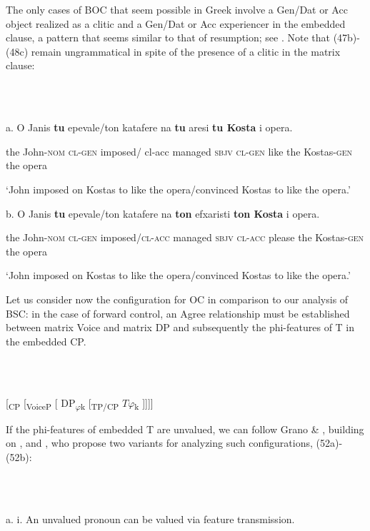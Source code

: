 \documentclass[output=paper]{langsci/langscibook}
\begin{document}
\begin{styleNurTexti}
  The only cases of BOC that seem possible in Greek involve a Gen/Dat or Acc object realized as a clitic and a Gen/Dat or Acc experiencer in the embedded clause, a pattern that seems similar to that of resumption; see . Note that (47b)-(48c) remain ungrammatical in spite of the presence of a clitic in the matrix clause:
\end{styleNurTexti}

\ea%
    \label{ex:key:50}
    \gll\\
        \\
    \glt
    \z

          a.  O    Janis    \textbf{tu}  epevale/ton katafere   na   \textbf{tu} aresi  \textbf{tu  Kosta}          i opera.

the John-\textsc{nom}   \textsc{cl-gen}  imposed/ cl-acc managed  \textsc{sbjv} \textsc{cl-gen}  like   the Kostas-\textsc{gen} the opera

    ‘John imposed on Kostas to like the opera/convinced Kostas to like the opera.’

  b.  O    Janis    \textbf{tu}  epevale/ton katafere   na   \textbf{ton} efxaristi  \textbf{ton  Kosta}         i opera.

the John-\textsc{nom} \textsc{cl-gen}  imposed/\textsc{cl-acc} managed  \textsc{sbjv} \textsc{cl-acc}  please the Kostas-\textsc{gen} the opera

    ‘John imposed on Kostas to like the opera/convinced Kostas to like the opera.’

Let us consider now the configuration for OC in comparison to our analysis of BSC: in the case of forward control, an Agree relationship must be established between matrix Voice and matrix DP and subsequently the phi-features of T in the embedded CP.    

\ea%
    \label{ex:key:51}
    \gll\\
        \\
    \glt
    \z

          [\textsubscript{CP} [\textsubscript{VoiceP} [ DP\textsubscript{$\varphi $}\textsubscript{k} [\textsubscript{TP/CP}    $T\varphi $\textsubscript{k}    ]]]]

If the phi-features of embedded T are unvalued, we can follow Grano \& \citet{Lasnik2016}, building on \citet{Kratzer2009}, and \citet{Landau2015}, who propose two variants for analyzing such configurations, (52a)-(52b):

\begin{stylepi}
\ea%
    \label{ex:key:52}
    \gll\\
        \\
    \glt
    \z

          a.  i.  An unvalued pronoun can be valued via feature transmission.
\end{stylepi}
\end{document}
